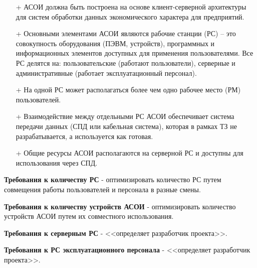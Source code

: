 \documentclass[12pt, a4paper, simple]{eskdtext}
\begin{document}
    \begin{itemize}
        \item[+] АСОИ должна быть построена на основе клиент-серверной архитектуры для систем обработки дан­ных экономического характера для предприятий. 
        \item[+] Основными элементами АСОИ являются рабочие станции (РС) – это совокупность оборудования (ПЭВМ, устройств), программных и информационных элементов дос­тупных для применения пользователями. Все РС делятся на: пользовательские (работают поль­зователи), серверные и административные (работает эксплуатационный персонал). 
        \item[+] На одной РС может располагаться более чем одно рабочее место (РМ) пользователей.
        \item[+] Взаимодействие между отдельными РС АСОИ обеспечивает система передачи данных (СПД или ка­бельная система), которая в рамках ТЗ не разрабатывается, а используется как готовая.
        \item[+] Общие ресурсы АСОИ располагаются на серверной РС и доступны для использования через СПД.
    \end{itemize}

    \textbf{Требования к количеству РС} - оптимизировать количество РС путем совмещения работы пользо­вате­лей
    и персонала в разные смены.

    \textbf{Требования к количеству устройств АСОИ} - оптимизировать количество устройств АСОИ путем
    их со­вместного использования.

    \textbf{Требования к серверным РС} - <<определяет разработчик проекта>>.

    \textbf{Требования к РС эксплуатационного персонала} - <<определяет разработчик проекта>>.
\end{document}
